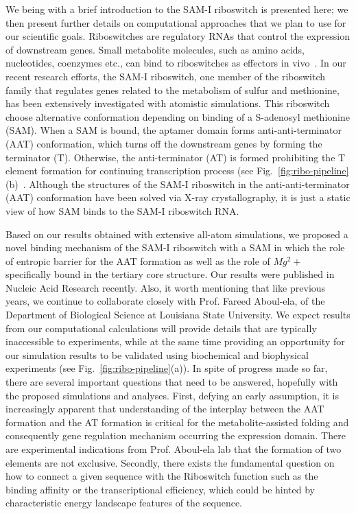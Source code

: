 \documentclass[a4paper,10pt]{article}
\begin{document}
We being with a brief introduction to the SAM-I riboswitch is presented here; we then present further details on computational approaches that we plan to use for our scientific goals.  Riboswitches are regulatory RNAs that control the expression of downstream genes. Small metabolite molecules, such as amino acids, nucleotides, coenzymes etc., can bind to riboswitches as effectors in vivo~\cite{mandal}.  In our recent research efforts, the SAM-I riboswitch, one member of the riboswitch family that regulates genes related to the metabolism of sulfur and methionine, has been extensively investigated with atomistic simulations.  This riboswitch choose alternative conformation depending on binding of a S-adenosyl methionine (SAM).  When a SAM is bound, the aptamer domain forms anti-anti-terminator (AAT) conformation, which turns off the downstream genes by forming the terminator (T). Otherwise, the anti-terminator (AT) is formed prohibiting the T element formation for continuing transcription process (see Fig.~\ref{fig:ribo-pipeline}(b)~\cite{brooke}.  Although the structures of the SAM-I riboswitch in the anti-anti-terminator (AAT) conformation have been solved via X-ray crystallography, it is just a static view of how SAM binds to the SAM-I riboswitch RNA.  

Based on our results obtained with extensive all-atom simulations, we proposed a novel binding mechanism of the SAM-I riboswitch with a SAM in which the role of entropic barrier for the AAT formation as well as the role of $Mg^2+$ specifically bound in the tertiary core structure.  Our results were published in Nucleic Acid Research recently\cite{SAM-I-NAR2009}.  Also, it worth mentioning that like previous years, we continue to collaborate closely with Prof. Fareed Aboul-ela, of the Department of Biological Science at Louisiana State University. We expect results from our computational calculations will provide details that are typically inaccessible to experiments, while at the same time providing an opportunity for our simulation results  to be validated using biochemical and biophysical experiments (see Fig.~\ref{fig:ribo-pipeline}(a)).   In spite of progress made so far, there are
several important questions that  need to be answered, hopefully with the proposed simulations and analyses.  First, defying an early assumption, it is increasingly apparent that understanding of the interplay between the AAT formation and the AT formation is critical for the metabolite-assisted folding and consequently gene regulation mechanism occurring the expression domain.  There are experimental indications from Prof. Aboul-ela lab that the formation of two elements are not exclusive.  Secondly, there exists the fundamental question on how to connect a given sequence with the Riboswitch function such as the binding affinity or the transcriptional efficiency, which could be hinted by characteristic energy landscape features of the sequence. 
\end{document}
